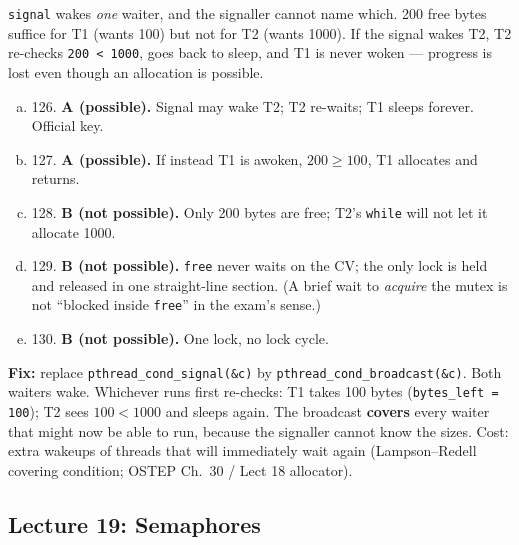 \documentclass[11pt,a4paper]{article}
\newenvironment{Sol}{%
  \begin{tcolorbox}[sboxstyle, title={Solution}]%
}{%
  \end{tcolorbox}\vspace{0.35em}%
}
\begin{document}
\begin{Sol}
\texttt{signal} wakes \emph{one} waiter, and the signaller cannot name
which. 200 free bytes suffice for T1 (wants 100) but not for T2 (wants
1000). If the signal wakes T2, T2 re-checks \texttt{200 < 1000}, goes
back to sleep, and T1 is never woken --- progress is lost even though
an allocation is possible.

\begin{enumerate}[(a)]
\item 126. \textbf{A (possible).} Signal may wake T2; T2 re-waits; T1
      sleeps forever. Official key.
\item 127. \textbf{A (possible).} If instead T1 is awoken, $200 \ge 100$,
      T1 allocates and returns.
\item 128. \textbf{B (not possible).} Only 200 bytes are free; T2's
      \texttt{while} will not let it allocate 1000.
\item 129. \textbf{B (not possible).} \texttt{free} never waits on
      the CV; the only lock is held and released in one straight-line
      section. (A brief wait to \emph{acquire} the mutex is not
      ``blocked inside \texttt{free}'' in the exam's sense.)
\item 130. \textbf{B (not possible).} One lock, no lock cycle.
\end{enumerate}

\textbf{Fix:} replace \texttt{pthread\_cond\_signal(\&c)} by
\texttt{pthread\_cond\_broadcast(\&c)}. Both waiters wake. Whichever
runs first re-checks: T1 takes 100 bytes (\texttt{bytes\_left = 100});
T2 sees $100 < 1000$ and sleeps again. The broadcast
\textbf{covers} every waiter that might now be able to run, because
the signaller cannot know the sizes. Cost: extra wakeups of threads
that will immediately wait again (Lampson--Redell covering condition;
OSTEP Ch.~30 / Lect 18 allocator).
\end{Sol}

\subsection{Lecture 19: Semaphores}
\end{document}
